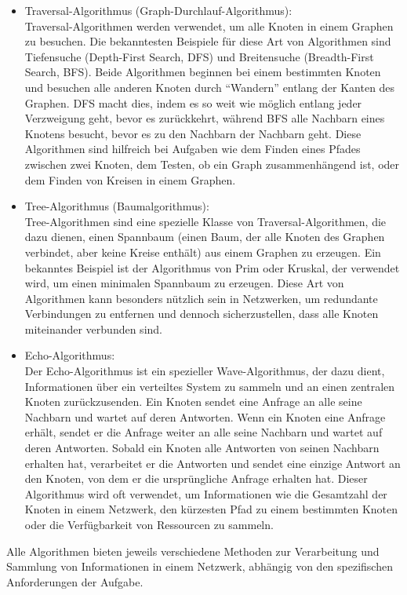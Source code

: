 \begin{itemize}
\item Traversal-Algorithmus (Graph-Durchlauf-Algorithmus): \\Traversal-Algorithmen werden verwendet, um alle Knoten in einem Graphen zu besuchen. Die bekanntesten Beispiele für diese Art von Algorithmen sind Tiefensuche (Depth-First Search, DFS) und Breitensuche (Breadth-First Search, BFS). Beide Algorithmen beginnen bei einem bestimmten Knoten und besuchen alle anderen Knoten durch \enquote{Wandern} entlang der Kanten des Graphen. DFS macht dies, indem es so weit wie möglich entlang jeder Verzweigung geht, bevor es zurückkehrt, während BFS alle Nachbarn eines Knotens besucht, bevor es zu den Nachbarn der Nachbarn geht. Diese Algorithmen sind hilfreich bei Aufgaben wie dem Finden eines Pfades zwischen zwei Knoten, dem Testen, ob ein Graph zusammenhängend ist, oder dem Finden von Kreisen in einem Graphen.
\item Tree-Algorithmus (Baumalgorithmus): \\Tree-Algorithmen sind eine spezielle Klasse von Traversal-Algorithmen, die dazu dienen, einen Spannbaum (einen Baum, der alle Knoten des Graphen verbindet, aber keine Kreise enthält) aus einem Graphen zu erzeugen. Ein bekanntes Beispiel ist der Algorithmus von Prim oder Kruskal, der verwendet wird, um einen minimalen Spannbaum zu erzeugen. Diese Art von Algorithmen kann besonders nützlich sein in Netzwerken, um redundante Verbindungen zu entfernen und dennoch sicherzustellen, dass alle Knoten miteinander verbunden sind.
\item Echo-Algorithmus: \\Der Echo-Algorithmus ist ein spezieller Wave-Algorithmus, der dazu dient, Informationen über ein verteiltes System zu sammeln und an einen zentralen Knoten zurückzusenden. Ein Knoten sendet eine Anfrage an alle seine Nachbarn und wartet auf deren Antworten. Wenn ein Knoten eine Anfrage erhält, sendet er die Anfrage weiter an alle seine Nachbarn und wartet auf deren Antworten. Sobald ein Knoten alle Antworten von seinen Nachbarn erhalten hat, verarbeitet er die Antworten und sendet eine einzige Antwort an den Knoten, von dem er die ursprüngliche Anfrage erhalten hat. Dieser Algorithmus wird oft verwendet, um Informationen wie die Gesamtzahl der Knoten in einem Netzwerk, den kürzesten Pfad zu einem bestimmten Knoten oder die Verfügbarkeit von Ressourcen zu sammeln.
\end{itemize}
Alle Algorithmen bieten jeweils verschiedene Methoden zur Verarbeitung und Sammlung von Informationen in einem Netzwerk, abhängig von den spezifischen Anforderungen der Aufgabe.

